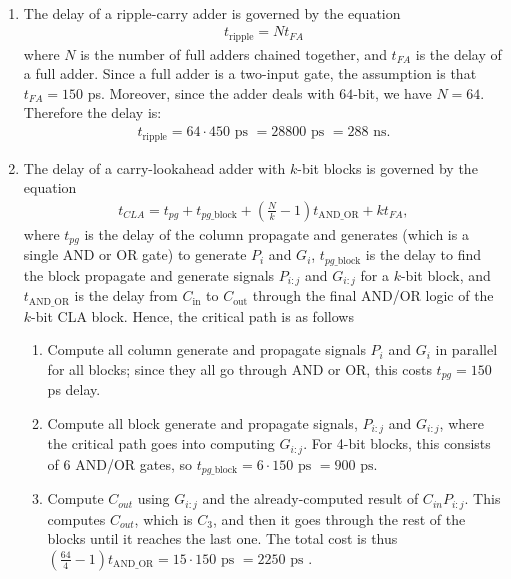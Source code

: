 \documentclass[12pt]{article}
\newenvironment{sol}[1][Solution]{\begin{trivlist}
		\item[\hskip \labelsep {\bfseries #1:}]}{\end{trivlist}}
\begin{document}
\begin{sol}
	\
	\begin{enumerate}[label=(\alph*)]
		\item The delay of a ripple-carry adder is governed by
		the equation
		\begin{align*}
			t_{\text{ripple}}=Nt_{FA}
		\end{align*}
		where $N$ is the number of full adders chained together, and $t_{FA}$ is the delay
		of a full adder. Since a full adder is a two-input gate, the assumption is that
		$t_{FA}=150$ ps. Moreover, since the adder deals with $64$-bit, we have $N=64$.
		Therefore the delay is:
		\begin{align*}
			t_{\text{ripple}}=64\cdot 450 \text{ ps } =  28800 \text{ ps } = 288 \text{ ns}.
		\end{align*}
		\item The delay of a carry-lookahead adder with $k$-bit blocks is governed by
		the equation
		\begin{align*}
			t_{CLA}=t_{pg}+t_{pg\_\text{block}}+\left(\frac{N}{k}-1\right)t_{\text{AND\_OR}}+kt_{FA},
		\end{align*}
		where $t_{pg}$ is the delay of the column propagate and generates (which is a single
		AND or OR gate) to generate $P_i$ and $G_i$, $t_{pg\_\text{block}}$ is the delay to find
		the block propagate and generate signals $P_{i:j}$ and $G_{i:j}$ for a $k$-bit block,
		and $t_{\text{AND\_OR}}$ is the delay from $C_{\text{in}}$ to $C_{\text{out}}$ through
		the final AND/OR logic of the $k$-bit CLA block. Hence, the critical path is as follows
		\begin{enumerate}[label=(\roman*)]
			\item Compute all column generate and propagate signals $P_i$ and $G_i$
			in parallel for all blocks; since they all go through AND or OR, this
			costs $t_{pg}=150$ ps delay.
			\item Compute all block generate and propagate signals, $P_{i:j}$ and
			$G_{i:j}$, where the critical path goes into computing $G_{i:j}$. For
			4-bit blocks, this consists of 6 AND/OR gates, so
			$t_{pg\_\text{block}}=6\cdot 150\text { ps }=900\text{ ps}$.
			\item Compute $C_{out}$ using $G_{i:j}$ and the already-computed result
			of $C_{in}P_{i:j}$. This computes $C_{out}$, which is $C_3$, and then
			it goes through the rest of the blocks until it reaches the last one.
			The total cost is thus $\left(\frac{64}{4}-1\right)t_{\text{AND\_OR}}=15\cdot 150 \text{ ps }=
			2250\text{ ps }$.

\end{enumerate}
\end{enumerate}
\end{sol}
\end{document}
